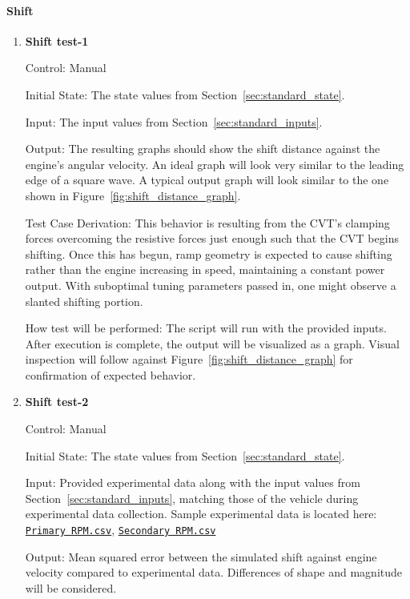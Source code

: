 \documentclass[12pt, titlepage]{article}
\newcommand{\refdata}[2]{
  \href{https://github.com/gr812b/CVT-Simulator/blob/main/experimental-data/#1
  }{\texttt{#2}}}
\begin{document}
\paragraph{Shift}

\begin{enumerate}

  \item {} \hypertarget{Shift test-1}{\textbf{Shift test-1}} \label{Shift test-1}
  
  Control: Manual
            
  Initial State: The state values from Section~\ref{sec:standard_state}.
  
  Input: The input values from Section~\ref{sec:standard_inputs}.
            
  Output: The resulting graphs should show the shift distance against the engine's angular velocity. An ideal graph will look very similar to the leading edge of a square wave. A typical output graph will look similar to the one shown in Figure~\ref{fig:shift_distance_graph}.
  
  Test Case Derivation: This behavior is resulting from the CVT's clamping forces overcoming the resistive forces just enough such that the CVT begins shifting. Once this has begun, ramp geometry is expected to cause shifting rather than the engine increasing in speed, maintaining a constant power output. With suboptimal tuning parameters passed in, one might observe a slanted shifting portion.
  
  How test will be performed: The script will run with the provided inputs. After execution is complete, the output will be visualized as a graph. Visual inspection will follow against Figure~\ref{fig:shift_distance_graph} for confirmation of expected behavior.
  
  \item {} \hypertarget{Shift test-2}{\textbf{Shift test-2}} \label{Shift test-2}

  Control: Manual

  Initial State: The state values from Section~\ref{sec:standard_state}.

  Input: Provided experimental data along with the input values from Section~\ref{sec:standard_inputs}, matching those of the vehicle during experimental data collection. Sample experimental data is located here: \refdata{RPM\%20PRIM.csv}{Primary RPM.csv}, \refdata{RPM\%20SEC.csv}{Secondary RPM.csv} 

  Output: Mean squared error between the simulated shift against engine velocity compared to experimental data. Differences of shape and magnitude will be considered.


\end{enumerate}
\end{document}
